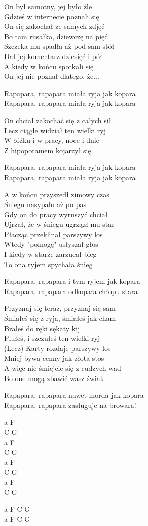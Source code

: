 \begin{text}
    On był samotny, jej było źle\\
    Gdzieś w internecie poznali się\\
    On się zakochał ze samych zdjęć\\
    Bo tam rusałka, dziewczę na pięć\\
    Szczęka mu spadła aż pod sam stół\\
    Dał jej komentarz dziesięć i pół\\
    A kiedy w końcu spotkali się\\
    On jej nie poznał dlatego, że...

    \vin Rapapara, rapapara miała ryja jak kopara\\
    \vin Rapapara, rapapara miała ryja jak kopara

    On chciał zakochać się z całych sił\\
    Lecz ciągle widział ten wielki ryj\\
    W łóżku i w pracy, noce i dnie\\
    Z hipopotamem kojarzył się

    \vin Rapapara, rapapara miała ryja jak kopara\\
    \vin Rapapara, rapapara miała ryja jak kopara

    A w końcu przyszedł zimowy czas\\
    Śniegu nasypało aż po pas\\
    Gdy on do pracy wyruszyć chciał\\
    Ujrzał, że w śniegu ugrzązł mu star\\
    Płacząc przeklinał parszywy los\\
    Wtedy "pomogę" usłyszał głos\\
    I kiedy w starze zarzucał bieg\\
    To ona ryjem spychała śnieg

    \vin Rapapara, rapapara i tym ryjem jak kopara\\
    \vin Rapapara, rapapara odkopała chłopu stara

    Przyznaj się teraz, przyznaj się sam\\
    Śmiałeś się z ryja, śmiałeś jak cham\\
    Brałeś do ręki sękaty kij\\
    Plułeś, i szczułeś ten wielki ryj\\
    (Lecz) Karty rozdaje parszywy los\\
    Mniej bywa cenny jak złota stos\\
    A więc nie śmiejcie się z cudzych wad\\
    Bo one mogą zbawić wasz świat

    \vin Rapapara, rapapara nawet morda jak kopara\\
    \vin Rapapara, rapapara zasługuje na browara!	
\end{text}
\begin{chord}
    a F\\
    C G\\
    a F\\
    C G\\
    a F\\
    C G\\
    a F\\
    C G

    a F C G\\
    a F C G
\end{chord}
